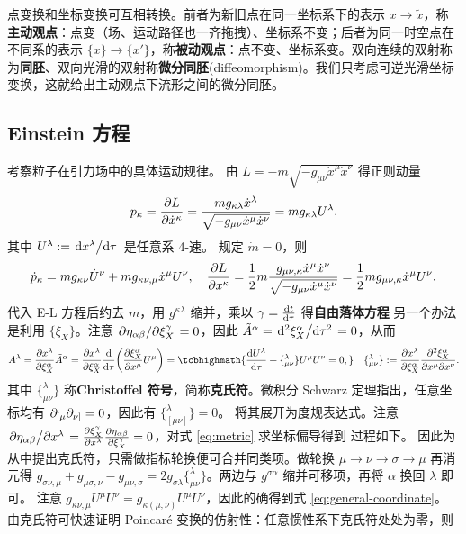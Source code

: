 点变换和坐标变换可互相转换。前者为新旧点在同一坐标系下的表示 $x\to\tilde x$，称\textbf{主动观点}：点变（场、运动路径也一齐拖拽）、坐标系不变；后者为同一时空点在不同系的表示 $\{x\}\to\{x'\}$，称\textbf{被动观点}：点不变、坐标系变。双向连续的双射称为\textbf{同胚}、双向光滑的双射称\textbf{微分同胚}(diffeomorphism)。我们只考虑可逆光滑坐标变换，这就给出主动观点下流形之间的微分同胚。

\subsection{Einstein 方程}\label{sec:Einstein}

考察粒子在引力场中的具体运动规律。
由 $L=-m\sqrt{-g_{\mu\nu}\dot x^\mu\dot x^\nu}$ 得正则动量
\[p_\kappa=\pdv{L}{\dot x^\kappa} = \frac{mg_{\kappa\lambda}\dot x^\lambda}{\sqrt{-g_{\mu\nu}\dot x^\mu\dot x^\nu}} = mg_{\kappa\lambda}U^\lambda.\]
其中 $U^\lambda := \dv*{x^\lambda}{\tau}$ 是任意系 4-速。
规定 $\dot m = 0$，则 
\[\dot p_\kappa = mg_{\kappa\nu}\dot U^\nu + mg_{\kappa\nu,\mu} \dot x^\mu U^\nu,\quad \pdv{L}{x^\kappa}=\frac{1}{2}m\frac{g_{\mu\nu,\kappa}\dot x^\mu\dot x^\nu}{\sqrt{-g_{\mu\nu}\dot x^\mu\dot x^\nu}}=\frac{1}{2}mg_{\mu\nu,\kappa}\dot x^\mu U^\nu.\]
代入 E-L 方程后约去 $m$，用 $g^{\kappa\lambda}$ 缩并，乘以 $\gamma=\dv{t}{\tau}$ 得\textbf{自由落体方程}
另一个办法是利用 $\{\xi_X\}$。注意 $\pdv*{\eta_{\alpha\beta}}{\xi_X^\gamma} = 0$，因此 $\tilde A^\alpha=\dv*[2]{\xi_X^\alpha}{\tau}=0$，从而
\[A^\lambda=\pdv{x^\lambda}{\xi_X^\alpha}\tilde A^\alpha=\pdv{x^\lambda}{\xi_X^\alpha}\dv{\tau}(\pdv{\xi_X^\alpha}{x^\mu}U^\mu)=\tcbhighmath{\dv{U^\lambda}{\tau}+\{^\lambda_{\mu\nu}\}U^\mu U^\nu=0,} \quad \{^\lambda_{\mu\nu}\}:=\pdv{x^\lambda}{\xi_X^\alpha}\pdv{\xi_X^\alpha}{x^\mu}{x^\nu}.\]
其中 $\{^\lambda_{\mu\nu}\}$ 称\textbf{Christoffel 符号}，简称\textbf{克氏符}。微积分 Schwarz 定理指出，任意坐标均有 $\partial_{[\mu}\partial_{\nu]}=0$，因此有 $\{^\lambda_{[\mu\nu]}\}=0$。
将其展开为度规表达式。注意 $\pdv*{\eta_{\alpha\beta}}{x^\lambda} = \pdv{\xi_X^\gamma}{x^\lambda}\pdv{\eta_{\alpha\beta}}{\xi_X^\gamma} = 0$，对式 \eqref{eq:metric} 求坐标偏导得到
过程如下。
因此为从中提出克氏符，只需做指标轮换便可合并同类项。做轮换 $\mu\to\nu\to\sigma\to\mu$ 再消元得 $g_{\sigma\nu,\mu}+ g_{\mu\sigma,\nu}-  g_{\mu\nu,\sigma}=2g_{\sigma\lambda}\{^\lambda_{\mu\nu}\}$。两边与 $g^{\sigma\alpha}$ 缩并可移项，再将 $\alpha$ 换回 $\lambda$ 即可。
注意 $g_{\kappa\nu,\mu}U^\mu U^\nu=g_{\kappa(\mu,\nu)}U^\mu U^\nu$，因此的确得到式 \eqref{eq:general-coordinate}。
由克氏符可快速证明 Poincaré 变换的仿射性：任意惯性系下克氏符处处为零，则

